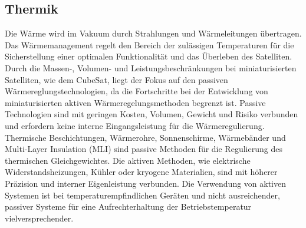 		\subsection{Thermik}%
		Die Wärme wird im Vakuum durch Strahlungen und Wärmeleitungen übertragen. Das Wärmemanagement regelt den Bereich der zulässigen Temperaturen für die Sicherstellung einer optimalen Funktionalität und das Überleben des Satelliten. Durch die Massen-, Volumen- und Leistungsbeschränkungen bei miniaturisierten Satelliten, wie dem CubeSat, liegt der Fokus auf den passiven Wärmereglungstechnologien, da die Fortschritte bei der Entwicklung von miniaturisierten aktiven Wärmeregelungsmethoden begrenzt ist. Passive Technologien sind mit geringen Kosten, Volumen, Gewicht und Risiko verbunden und erfordern keine interne Eingangsleistung für die Wärmeregulierung. Thermische Beschichtungen, Wärmerohre, Sonnenschirme, Wärmebänder und Multi-Layer Insulation (MLI) sind passive Methoden für die Regulierung des thermischen Gleichgewichtes. Die aktiven Methoden, wie elektrische Widerstandsheizungen, Kühler oder kryogene Materialien, sind mit höherer Präzision und interner Eigenleistung verbunden. Die Verwendung von aktiven Systemen ist bei temperaturempfindlichen Geräten und nicht ausreichender, passiver Systeme für eine Aufrechterhaltung der Betriebstemperatur vielversprechender. \cite[S. 109 - 120]{NASA.Sota.2018} 

